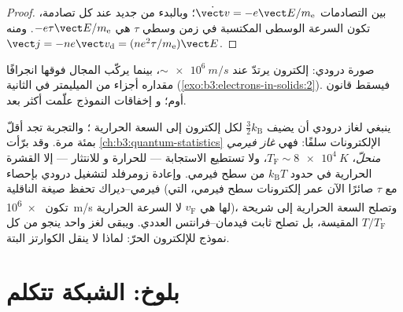\begin{proof}
بين التصادمات $\dot{\vect v} = -e\vect E/m_{\text{e}}$؛
وبالبدء من جديد عند كل تصادمة، تكون السرعة الوسطى المكتسبة في
زمن وسطي $\tau$ هي $-e\tau\vect E/m_{\text{e}}$. ومنه $\vect j =
-ne\vect v_{\text{d}} = (ne^2\tau/m_{\text{e}})\vect E$.
\end{proof}

\begin{omfigure}

{\small صورة درودي: إلكترون يرتدّ عند
$\sim\qty{e6}{m/s}$، بينما يركّب المجال فوقها انجرافًا مقداره
أجزاء من الميليمتر في الثانية
(\cref{exo:b3:electrons-in-solids:2}). فيسقط قانون أوم؛ و
إخفاقات النموذج علّمت أكثر بعد.}
\end{omfigure}

\begin{remark}\label{rem:b3:electrons-in-solids:sommerfeld}
ينبغي لغاز درودي أن يضيف $\tfrac32k_{\text{B}}$ لكل إلكترون إلى
السعة الحرارية ؛ والتجربة تجد أقلّ بمئة مرة.
وقد برّأت \cref{ch:b3:quantum-statistics} الإلكترونات سلفًا:
فهي \emph{غاز فيرمي منحلّ}، $T_{\text{F}} \sim
\qty{8e4}{K}$، ولا تستطيع الاستجابة --- للحرارة و
للانتثار --- إلا القشرة الحرارية في حدود $k_{\text{B}}T$ من سطح فيرمي.
وإعادة زومرفلد لتشغيل درودي بإحصاء فيرمي--ديراك
تحفظ صيغة الناقلية (مع $\tau$ صائرًا الآن
عمر إلكترونات سطح فيرمي، التي تكون \qty{e6}{m/s} لها هي
$v_{\text{F}}$ لا السرعة الحرارية)، وتصلح السعة الحرارية إلى شريحة
$T/T_{\text{F}}$ المقيسة، بل تصلح ثابت
فيدمان--فرانتس العددي. ويبقى لغز واحد ينجو من كل
نموذج للإلكترون الحرّ: لماذا لا ينقل الكوارتز البتة.
\end{remark}

\section{بلوخ: الشبكة تتكلم}

